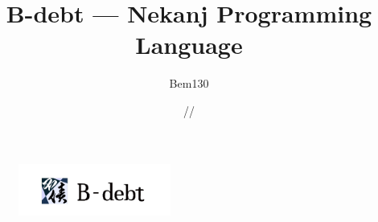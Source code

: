 \documentclass[a4paper,10.5pt]{ltjsarticle}
\begin{document}
\begin{titlepage}

\title{\Huge B-debt --- Nekanj Programming Language}
\author{\LARGE Bem130}
\date{\number\year \slash \number\month \slash \number\day}

\maketitle


\tableofcontents


\begin{figure}[b]
    \includegraphics[width=5cm]{./logo/npl-logotype.png}
\end{figure}
\end{titlepage}



\end{document}
